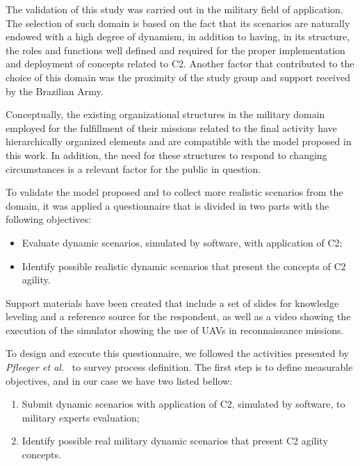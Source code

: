 The validation of this study was carried out in the military field of application. The selection of such domain is based on the fact that its scenarios are naturally endowed with a high degree of dynamism, in addition to having, in its structure, the roles and functions well defined and required for the proper implementation and deployment of concepts related to C2. Another factor that contributed to the choice of this domain was the proximity of the study group and support received by the Brazilian Army.

Conceptually, the existing organizational structures in the military domain employed for the fulfillment of their missions related to the final activity have hierarchically organized elements and are compatible with the model proposed in this work. In addition, the need for these structures to respond to changing circumstances is a relevant factor for the public in question. 

To validate the model proposed and to collect more realistic scenarios from the domain, it was applied a questionnaire that is divided in two parts with the following objectives:

\begin{itemize}
    \item Evaluate dynamic scenarios, simulated by software, with application of C2;
    \item Identify possible realistic dynamic scenarios that present the concepts of C2 agility.
\end{itemize}

Support materials have been created that include a set of slides for knowledge leveling and a reference source for the respondent, as well as a video showing the execution of the simulator showing the use of UAVs in reconnaissance missions. 

To design and execute this questionnaire, we followed the activities presented by \textit{Pfleeger et al.}~\cite{survey01}  to survey process definition. The first step is to define measurable objectives, and in our case we have two listed bellow:

\begin{enumerate}
    \item Submit dynamic scenarios with application of C2, simulated by software, to military experts evaluation;
    \item Identify possible real military dynamic scenarios that present C2 agility concepts.
\end{enumerate}

